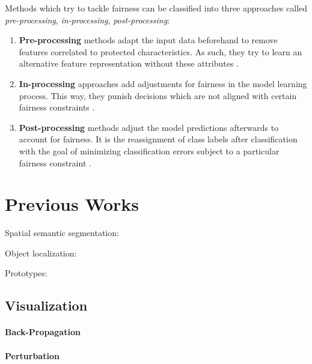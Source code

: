 Methods which try to tackle fairness can be classified into three approaches called \emph{pre-processing}, \emph{in-processing}, \emph{post-processing}:
\begin{enumerate}
    \item \textbf{Pre-processing} methods adapt the input data beforehand to remove features correlated to protected characteristics. As such, they try to learn an alternative feature representation without these attributes \citep{GordalizaBGL19, CalmonWVRV17, LouizosSLWZ15, ZemelWSPD13}. 
    \item \textbf{In-processing} approaches add adjustments for fairness in the model learning process. This way, they punish decisions which are not aligned with certain fairness constraints \citep{DworkIKL18, DoniniOBSP18, AgarwalBD0W18}.
    \item \textbf{Post-processing} methods adjust the model predictions afterwards to account for fairness. It is the reassignment of class labels after classification with the goal of minimizing 
    classification errors subject to a particular fairness constraint \citep{HardtPNS16,PleissRWKW17, FeldmanFMSV15}.
\end{enumerate}


\section{Previous Works}

\citep{BargalZKZMS18} \citep{SelvarajuCDVPB20} \citep{SimonyanVZ13} \citep{SpringenbergDBR14} \citep{ZeilerF14} \citep{ZhangBLBSS18} \citep{ZhouKLOT16} \citep{ChenLTBRS19} 
\citep{CaoLYYWWHWHXRH15} \citep{SelvarajuLSJGHB19} \citep{RossHD17}

Spatial semantic segmentation: \citep{LiWPE018} \citep{ZhouZYQJ18} \citep{WeiFLCZY17}

Object localization: \citep{ZhangWF0H18}

 Prototypes: \citep{LiLCR18}

\subsection{Visualization}
\paragraph{Back-Propagation}
\paragraph{Perturbation}

